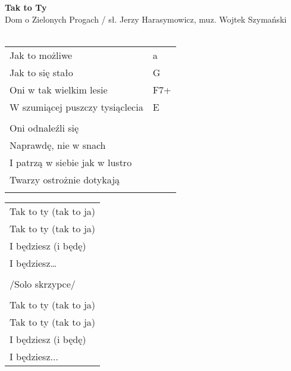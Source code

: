 \documentclass[a5paper]{article}
\begin{document}


\noindent
\fontsize{12pt}{15pt}\selectfont
\textbf{Tak to Ty} \\
\fontsize{8pt}{10pt}\selectfont
Dom o Zielonych Progach / sł. Jerzy Harasymowicz, muz. Wojtek Szymański \\ \\
\fontsize{10pt}{12pt}\selectfont
{}
\begin{tabular}{@{}p{6.50cm}p{3cm}@{}}
\noindent
Jak to możliwe & a \\
Jak to się stało & G \\
Oni w tak wielkim lesie & F7+ \\
W szumiącej puszczy tysiąclecia & E \\ \\

Oni odnaleźli się & \\
Naprawdę, nie w snach & \\
I patrzą w siebie jak w lustro & \\
Twarzy ostrożnie dotykają & \\ \\
\end{tabular}

\noindent
\begin{tabular}{@{}p{5.50cm}@{}}
Tak to ty (tak to ja) \\
Tak to ty (tak to ja) \\
I będziesz (i będę) \\
I będziesz… \\ \\

/Solo skrzypce/ \\ \\

Tak to ty (tak to ja) \\
Tak to ty (tak to ja) \\
I będziesz (i będę) \\
I będziesz...
\end{tabular}
\end{document}
